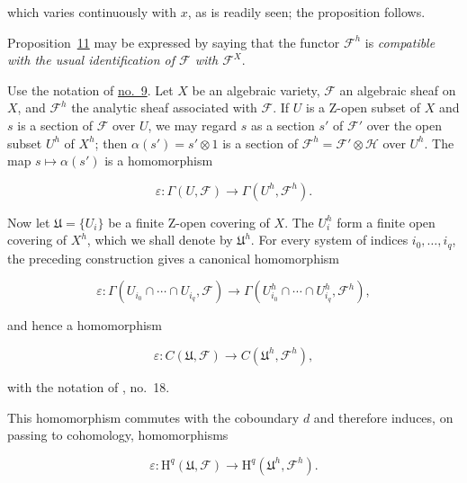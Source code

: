 which varies continuously with $x$, as is readily seen; the proposition follows.

Proposition~\hyperref[gaga:prop:11]{11} may be expressed by saying that the functor $\mathcal{F}^h$ is \emph{compatible with the usual identification of $\mathcal{F}$ with $\mathcal{F}^X$}.


Use the notation of \hyperref[gaga:no:9]{no.~9}. Let $X$ be an algebraic variety, $\mathcal{F}$ an algebraic sheaf on $X$, and $\mathcal{F}^h$ the analytic sheaf associated with $\mathcal{F}$. If $U$ is a Z-open subset of $X$ and $s$ is a section of $\mathcal{F}$ over $U$, we may regard $s$ as a section $s'$ of $\mathcal{F}'$ over the open subset $U^h$ of $X^h$; then $\alpha(s')=s'\otimes1$ is a section of $\mathcal{F}^h=\mathcal{F}'\otimes\mathcal{H}$ over $U^h$. The map $s\mapsto\alpha(s')$ is a homomorphism

\begin{equation*}
\varepsilon:\Gamma(U,\mathcal{F})\longrightarrow\Gamma(U^h,\mathcal{F}^h).
\end{equation*}

Now let $\mathfrak{U}=\{U_i\}$ be a finite Z-open covering of $X$. The $U_i^h$ form a finite open covering of $X^h$, which we shall denote by $\mathfrak{U}^h$. For every system of indices $i_0,\ldots,i_q$, the preceding construction gives a canonical homomorphism

\begin{equation*}
\varepsilon:\Gamma(U_{i_0}\cap\cdots\cap U_{i_q},\mathcal{F})
\longrightarrow
\Gamma(U^h_{i_0}\cap\cdots\cap U^h_{i_q},\mathcal{F}^h),
\end{equation*}

and hence a homomorphism

\begin{equation*}
\varepsilon:C(\mathfrak{U},\mathcal{F})\longrightarrow C(\mathfrak{U}^h,\mathcal{F}^h),
\end{equation*}

with the notation of , no.~18.

This homomorphism commutes with the coboundary $d$ and therefore induces, on passing to cohomology, homomorphisms

\begin{equation*}
\varepsilon:\mathrm{H}^q(\mathfrak{U},\mathcal{F})
\longrightarrow
\mathrm{H}^q(\mathfrak{U}^h,\mathcal{F}^h).
\end{equation*}

